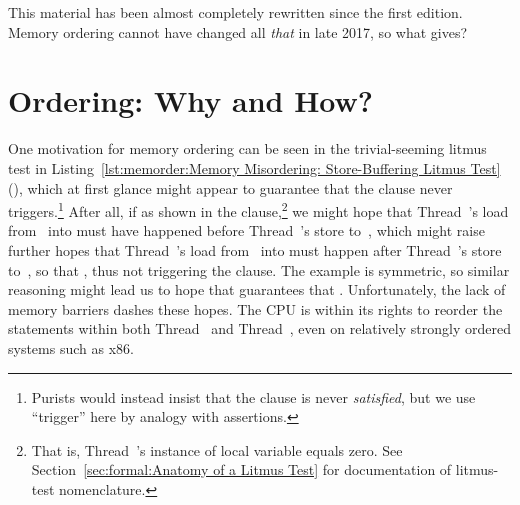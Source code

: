 \QuickQuiz{}
	This material has been almost completely rewritten since
	the first edition.
	Memory ordering cannot have changed all \emph{that} in late
	2017, so what gives?
 \QuickQuizEnd

\section{Ordering: Why and How?}
\label{sec:memorder:Ordering: Why and How?}

One motivation for memory ordering can be seen in the trivial-seeming
litmus test in
Listing~\ref{lst:memorder:Memory Misordering: Store-Buffering Litmus Test}
(),
which at first glance might
appear to guarantee that the  clause never triggers.\footnote{
	Purists would instead insist that the  clause is
	never \emph{satisfied}, but we use ``trigger'' here by
	analogy with assertions.}
After all, if  as shown in the  clause,\footnote{
	That is, Thread~'s instance of local variable 
	equals zero.
	See Section~\ref{sec:formal:Anatomy of a Litmus Test}
	for documentation of litmus-test nomenclature.}
we might hope that Thread~'s load from~ into 
must have happened before Thread~'s store to~, which
might raise further hopes that Thread~'s load from~
into  must happen after Thread~'s store to~,
so that , thus not triggering the  clause.
The example is symmetric, so similar reasoning might lead
us to hope that  guarantees that .
Unfortunately, the lack of memory barriers dashes these hopes.
The CPU is within its rights to reorder
the statements within both Thread~ and Thread~,
even on relatively strongly ordered systems such as x86.

